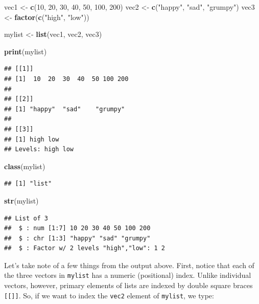 \documentclass[]{book}
\newenvironment{Shaded}{\begin{snugshade}}{\end{snugshade}}
\newcommand{\DecValTok}[1]{\textcolor[rgb]{0.00,0.00,0.81}{#1}}
\newcommand{\KeywordTok}[1]{\textcolor[rgb]{0.13,0.29,0.53}{\textbf{#1}}}
\newcommand{\NormalTok}[1]{#1}
\newcommand{\StringTok}[1]{\textcolor[rgb]{0.31,0.60,0.02}{#1}}
\begin{document}
\begin{Shaded}
\begin{Highlighting}[]
\NormalTok{vec1 <-}\StringTok{ }\KeywordTok{c}\NormalTok{(}\DecValTok{10}\NormalTok{, }\DecValTok{20}\NormalTok{, }\DecValTok{30}\NormalTok{, }\DecValTok{40}\NormalTok{, }\DecValTok{50}\NormalTok{, }\DecValTok{100}\NormalTok{, }\DecValTok{200}\NormalTok{)}
\NormalTok{vec2 <-}\StringTok{ }\KeywordTok{c}\NormalTok{(}\StringTok{"happy"}\NormalTok{, }\StringTok{"sad"}\NormalTok{, }\StringTok{"grumpy"}\NormalTok{)}
\NormalTok{vec3 <-}\StringTok{ }\KeywordTok{factor}\NormalTok{(}\KeywordTok{c}\NormalTok{(}\StringTok{"high"}\NormalTok{, }\StringTok{"low"}\NormalTok{))}

\NormalTok{mylist <-}\StringTok{ }\KeywordTok{list}\NormalTok{(vec1, vec2, vec3)}

\KeywordTok{print}\NormalTok{(mylist)}
\end{Highlighting}
\end{Shaded}

\begin{verbatim}
## [[1]]
## [1]  10  20  30  40  50 100 200
## 
## [[2]]
## [1] "happy"  "sad"    "grumpy"
## 
## [[3]]
## [1] high low 
## Levels: high low
\end{verbatim}

\begin{Shaded}
\begin{Highlighting}[]
\KeywordTok{class}\NormalTok{(mylist)}
\end{Highlighting}
\end{Shaded}

\begin{verbatim}
## [1] "list"
\end{verbatim}

\begin{Shaded}
\begin{Highlighting}[]
\KeywordTok{str}\NormalTok{(mylist)}
\end{Highlighting}
\end{Shaded}

\begin{verbatim}
## List of 3
##  $ : num [1:7] 10 20 30 40 50 100 200
##  $ : chr [1:3] "happy" "sad" "grumpy"
##  $ : Factor w/ 2 levels "high","low": 1 2
\end{verbatim}

Let's take note of a few things from the output above. First, notice that each of the three vectors in \texttt{mylist} has a numeric (positional) index. Unlike individual vectors, however, primary elements of lists are indexed by double square braces \texttt{{[}{[}{]}{]}}. So, if we want to index the \texttt{vec2} element of \texttt{mylist}, we type:
\end{document}
